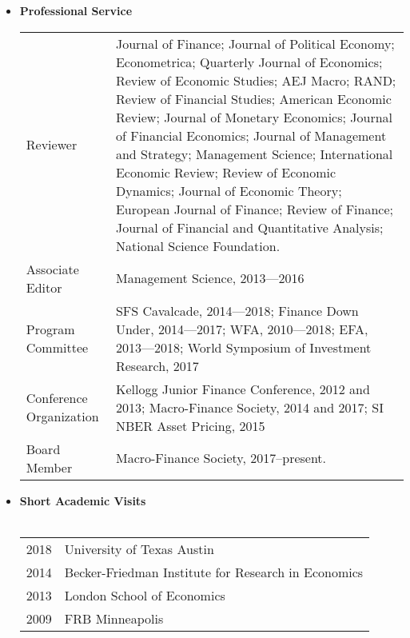 \documentclass[12pt,letterpaper,serif,overlapped]{res}
\begin{document}
\begin{resume}
\begin{itemize}
\item \textbf{Professional Service} \\





 \begin{tabular}{lp{11.5cm}}
Reviewer&
Journal of Finance; Journal of Political Economy; Econometrica; Quarterly Journal of Economics; Review of Economic Studies; AEJ Macro; RAND;  Review of Financial Studies; American Economic Review;  Journal of Monetary Economics; Journal of Financial Economics; Journal of Management and Strategy; Management Science;  International Economic Review; Review of Economic Dynamics;   Journal of Economic Theory;   European Journal of Finance;   Review of Finance; Journal of Financial and Quantitative Analysis; National Science Foundation.\\[0.2cm]
Associate Editor & Management Science, 2013---2016\\[0.2cm]
Program Committee & SFS Cavalcade, 2014---2018; Finance Down Under,   2014---2017;  WFA,  2010---2018; EFA, 2013---2018; World Symposium of Investment Research, 2017 \\[0.2cm]
Conference Organization & Kellogg Junior Finance Conference,  2012 and 2013;  Macro-Finance Society, 2014 and 2017; SI NBER Asset Pricing, 2015\\[0.2cm]
Board Member & Macro-Finance Society, 2017--present.
\\
 \end{tabular}



\clearpage


\vspace{0.5cm}
\item \textbf{Short Academic Visits} \\ \\
\begin{tabular}{lp{15cm}}
2018 & University of Texas Austin\\
2014  & Becker-Friedman Institute for Research in Economics \\
2013  & London  School of Economics\\
2009  & FRB Minneapolis
\end{tabular}
\vspace{0.5cm}




\end{itemize}
\end{resume}
\end{document}

